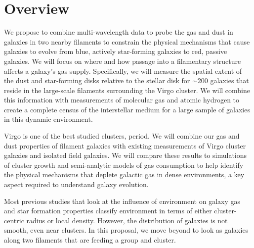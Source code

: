 \documentclass[11pt, preprint]{aastex}
\newcommand{\ha}{$H\alpha$}
\begin{document}
\section{Overview}
\vspace*{-.4cm}


We propose to combine multi-wavelength data to probe the gas and dust
in galaxies in two nearby filaments to constrain the physical mechanisms that cause galaxies to evolve from 
blue, actively star-forming galaxies to red, passive galaxies. We will focus on where 
and how passage into a filamentary structure affects a galaxy's gas
supply.  Specifically, we will measure the spatial extent 
of the dust and star-forming disks relative to the stellar disk for $\sim$200
galaxies that reside in the large-scale filaments surrounding the
Virgo cluster.  We will combine this information with measurements of
molecular gas and atomic hydrogen to create a complete census of the
interstellar medium for a large sample of galaxies in this dynamic
environment.  

Virgo is one of the best studied clusters, period.  
We will combine our gas and dust properties of
filament galaxies with existing measurements of Virgo cluster galaxies
and isolated field galaxies.  
We will compare these results to simulations of cluster growth and
semi-analytic models of gas consumption to help identify the physical mechanisms 
that deplete galactic gas in dense environments, a key aspect required to understand galaxy evolution. 

Most previous studies that look at the influence of environment on
galaxy gas and star formation properties classify environment in terms
of either cluster-centric radius or local density.  However, the
distribution of galaxies is not smooth, even near clusters.  In this
proposal, we move beyond  to look as galaxies along two filaments that
are feeding a group and cluster.



\end{document}
